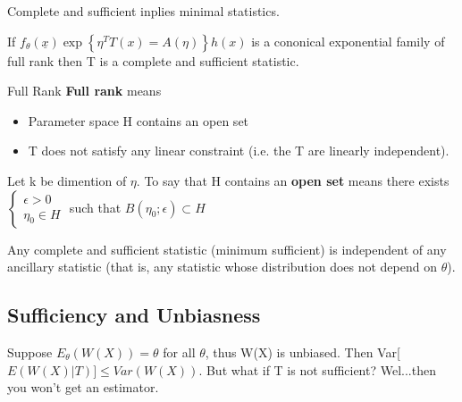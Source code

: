 \documentclass[11pt,fleqn]{book} %
\begin{document}
\begin{theorem}Complete and sufficient inplies minimal statistics.
	
\end{theorem}

\begin{theorem} If $f_\theta(\underline{x}) \exp\left\{\eta^T T(x)=A(\eta)\right\} h(x)$ is a cononical exponential family of full rank then T is a complete and sufficient statistic.
	
\end{theorem}

\begin{definition}{Full Rank} \textbf{Full rank} means
	\begin{itemize}
		\item Parameter space H contains an open set
		\item T does not satisfy any linear constraint (i.e. the T are linearly independent).
	\end{itemize}
\end{definition}

\begin{definition} Let k be dimention of $\eta$. To say that H contains an \textbf{open set} means there exists $\begin{cases} \epsilon >0 \\ \eta_0 \in H \end{cases}$ such that $B(\eta_0;\epsilon)\subset H$
	
\end{definition}

\begin{theorem} Any complete and sufficient statistic (minimum sufficient) is independent of any ancillary statistic (that is, any statistic whose distribution does not depend on $\theta$). 
	
\end{theorem}

\subsection{Sufficiency and Unbiasness}

Suppose $E_\theta(W(X)) = \theta$ for all $\theta$, thus W(X) is unbiased. Then Var[$E(W(X)|T)]\le Var(W(X))$. But what if T is not sufficient? Wel...then you won't get an estimator.
\end{document}
